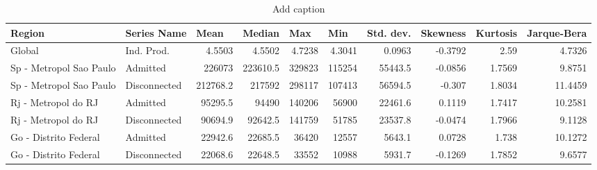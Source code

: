 \begin{table}[htbp]
  \centering
  \caption{Add caption}
    \begin{tabular}{p{4.215em}lrrrrrrrr}
    \toprule
    \textbf{Region} & \textbf{Series Name} & \multicolumn{1}{l}{\textbf{Mean}} & \multicolumn{1}{l}{\textbf{Median}} & \multicolumn{1}{l}{\textbf{Max}} & \multicolumn{1}{l}{\textbf{Min}} & \multicolumn{1}{p{4.215em}}{\textbf{Std. dev. }} & \multicolumn{1}{p{4.215em}}{\textbf{Skewness}} & \multicolumn{1}{p{4.215em}}{\textbf{Kurtosis}} & \multicolumn{1}{p{4.215em}}{\textbf{Jarque-Bera}} \\
    \midrule
    Global & Ind. Prod. & 4.5503 & 4.5502 & 4.7238 & 4.3041 & 0.0963 & -0.3792 & 2.59  & 4.7326 \\
    \midrule
    Sp - Metropol Sao Paulo & Admitted & 226073 & 223610.5 & 329823 & 115254 & 55443.5 & -0.0856 & 1.7569 & 9.8751 \\
    \midrule
    Sp - Metropol Sao Paulo & Disconnected & 212768.2 & 217592 & 298117 & 107413 & 56594.5 & -0.307 & 1.8034 & 11.4459 \\
    \midrule
    Rj - Metropol do RJ & Admitted & 95295.5 & 94490 & 140206 & 56900 & 22461.6 & 0.1119 & 1.7417 & 10.2581 \\
    \midrule
    Rj - Metropol do RJ & Disconnected & 90694.9 & 92642.5 & 141759 & 51785 & 23537.8 & -0.0474 & 1.7966 & 9.1128 \\
    \midrule
    Go - Distrito Federal & Admitted & 22942.6 & 22685.5 & 36420 & 12557 & 5643.1 & 0.0728 & 1.738 & 10.1272 \\
    \midrule
    Go - Distrito Federal & Disconnected & 22068.6 & 22648.5 & 33552 & 10988 & 5931.7 & -0.1269 & 1.7852 & 9.6577 \\
    \bottomrule
    \end{tabular}%
  \label{tab:addlabel}%
\end{table}%
